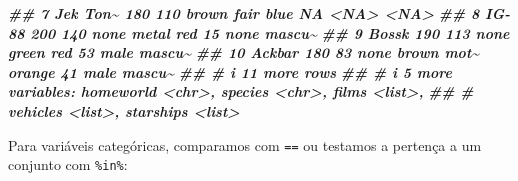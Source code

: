 \documentclass[
  portuguese,
  11pt,
  openany]{book}
\newenvironment{Shaded}{\begin{snugshade}}{\end{snugshade}}
\newcommand{\DocumentationTok}[1]{\textcolor[rgb]{0.56,0.35,0.01}{\textbf{\textit{#1}}}}
\newcounter{none} %
\begin{document}
\begin{Shaded}
\begin{Highlighting}[]
\DocumentationTok{\#\#  7 Jek Ton\textasciitilde{}    180   110 brown      fair       blue            NA   \textless{}NA\textgreater{}  \textless{}NA\textgreater{}  }
\DocumentationTok{\#\#  8 IG{-}88       200   140 none       metal      red             15   none  mascu\textasciitilde{}}
\DocumentationTok{\#\#  9 Bossk       190   113 none       green      red             53   male  mascu\textasciitilde{}}
\DocumentationTok{\#\# 10 Ackbar      180    83 none       brown mot\textasciitilde{} orange          41   male  mascu\textasciitilde{}}
\DocumentationTok{\#\# \# i 11 more rows}
\DocumentationTok{\#\# \# i 5 more variables: homeworld \textless{}chr\textgreater{}, species \textless{}chr\textgreater{}, films \textless{}list\textgreater{},}
\DocumentationTok{\#\# \#   vehicles \textless{}list\textgreater{}, starships \textless{}list\textgreater{}}
\end{Highlighting}
\end{Shaded}

Para variáveis categóricas, comparamos com \texttt{==} ou testamos a pertença a um conjunto
com \texttt{\%in\%}:
\end{document}
